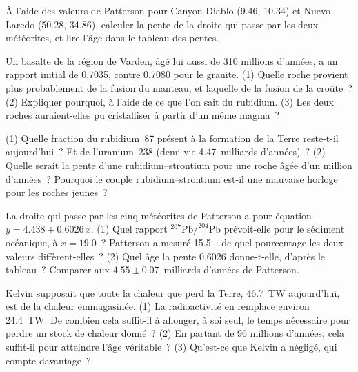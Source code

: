 \begin{exercise}[$\star\star$]\label{exo:g12:age-of-the-earth:11}
À l'aide des valeurs de Patterson pour Canyon Diablo (9.46, 10.34) et Nuevo
Laredo (50.28, 34.86), calculer la pente de la droite qui passe par les
deux météorites, et lire l'âge dans le tableau des pentes.
\end{exercise}

\begin{exercise}[$\star\star\star$]\label{exo:g12:age-of-the-earth:12}
Un basalte de la région de Varden, âgé lui aussi de 310 millions d'années,
a un rapport initial de 0.7035, contre 0.7080 pour le granite. (1) Quelle
roche provient plus probablement de la fusion du manteau, et laquelle de la
fusion de la croûte~? (2) Expliquer pourquoi, à l'aide de ce que l'on sait
du rubidium. (3) Les deux roches auraient-elles pu cristalliser à partir
d'un même magma~?
\end{exercise}

\begin{exercise}[$\star\star\star$]\label{exo:g12:age-of-the-earth:13}
(1) Quelle fraction du rubidium~87 présent à la formation de la Terre
reste-t-il aujourd'hui~? Et de l'uranium~238 (demi-vie 4.47~milliards
d'années)~? (2) Quelle serait la pente d'une  rubidium--strontium
pour une roche âgée d'un million d'années~? Pourquoi le couple
rubidium--strontium est-il une mauvaise horloge pour les roches jeunes~?
\end{exercise}

\begin{exercise}[$\star\star\star$]\label{exo:g12:age-of-the-earth:14}
La droite qui passe par les cinq météorites de Patterson a pour équation
$y = 4.438 + 0.6026\,x$. (1) Quel rapport $^{207}\mathrm{Pb}/^{204}\mathrm{Pb}$
prévoit-elle pour le sédiment océanique, à $x = 19.0$~? Patterson a
mesuré 15.5~: de quel pourcentage les deux valeurs diffèrent-elles~?
(2) Quel âge la pente 0.6026 donne-t-elle, d'après le tableau~? Comparer
aux $4.55 \pm 0.07$~milliards d'années de Patterson.
\end{exercise}

\begin{exercise}[$\star\star\star$]\label{exo:g12:age-of-the-earth:15}
Kelvin supposait que toute la chaleur que perd la Terre,
\qty{46.7}{TW} aujourd'hui, est de la chaleur emmagasinée. (1) La
radioactivité en remplace environ \qty{24.4}{TW}. De combien cela suffit-il
à allonger, à soi seul, le temps nécessaire pour perdre un stock de chaleur
donné~? (2) En partant de 96 millions d'années, cela suffit-il pour
atteindre l'âge véritable~? (3) Qu'est-ce que Kelvin a négligé, qui compte
davantage~?
\end{exercise}

